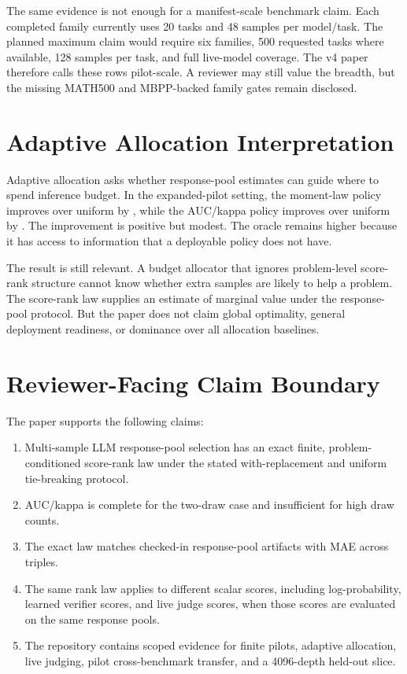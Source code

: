 The same evidence is not enough for a manifest-scale benchmark claim. Each
completed family currently uses 20 tasks and 48 samples per model/task. The
planned maximum claim would require six families, 500 requested tasks where
available, 128 samples per task, and full live-model coverage. The v4 paper
therefore calls these rows pilot-scale. A reviewer may still value the breadth,
but the missing MATH500 and MBPP-backed family gates remain disclosed.

\section{Adaptive Allocation Interpretation}
\label{app:allocation}

Adaptive allocation asks whether response-pool estimates can guide where to
spend inference budget. In the expanded-pilot setting, the moment-law policy
improves over uniform by \EvidenceMomentDelta{}, while the AUC/kappa policy
improves over uniform by \EvidenceAucDelta{}. The improvement is positive but
modest. The oracle remains higher because it has access to information that a
deployable policy does not have.

The result is still relevant. A budget allocator that ignores problem-level
score-rank structure cannot know whether extra samples are likely to help a
problem. The score-rank law supplies an estimate of marginal value under the
response-pool protocol. But the paper does not claim global optimality,
general deployment readiness, or dominance over all allocation baselines.

\section{Reviewer-Facing Claim Boundary}
\label{app:claim-boundary}

The paper supports the following claims:
\begin{enumerate}[leftmargin=*]
\item Multi-sample LLM response-pool selection has an exact finite,
problem-conditioned score-rank law under the stated with-replacement and
uniform tie-breaking protocol.
\item AUC/kappa is complete for the two-draw case and insufficient for high
draw counts.
\item The exact law matches checked-in response-pool artifacts with MAE
\EvidenceCoreMAE{} across \EvidenceTriples{} triples.
\item The same rank law applies to different scalar scores, including
log-probability, learned verifier scores, and live judge scores, when those
scores are evaluated on the same response pools.
\item The repository contains scoped evidence for finite pilots, adaptive
allocation, live judging, pilot cross-benchmark transfer, and a 4096-depth
held-out slice.
\end{enumerate}

